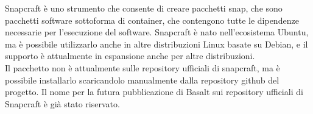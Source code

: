 Snapcraft è uno strumento che consente di creare pacchetti snap, che sono pacchetti software
sottoforma di container, che contengono tutte le dipendenze necessarie per l'esecuzione del software. 
Snapcraft è nato nell'ecosistema Ubuntu, ma è possibile utilizzarlo anche in altre distribuzioni Linux 
basate su Debian, e il supporto è attualmente in espansione anche per altre distribuzioni. \\ 

Il pacchetto non è attualmente sulle repository ufficiali di snapcraft, ma è possibile installarlo
scaricandolo manualmente dalla repository github del progetto. Il nome per la futura pubblicazione di 
Basalt sui repository ufficiali di Snapcraft è già stato riservato. \\